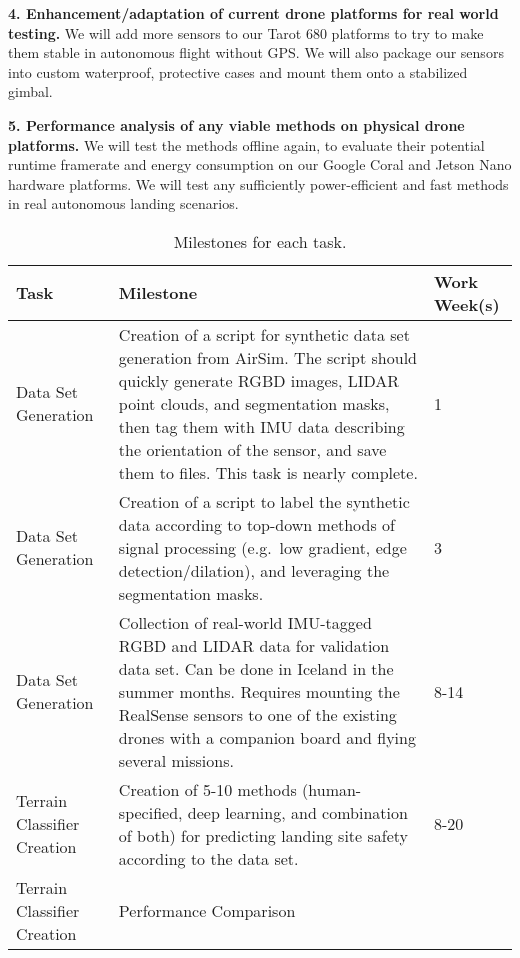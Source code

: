 \textbf{4. Enhancement/adaptation of current drone platforms for real world testing.}
We will add more sensors to our Tarot 680 platforms to try to make them stable in autonomous flight without GPS.
We will also package our sensors into custom waterproof, protective cases and mount them onto a stabilized gimbal.

\textbf{5. Performance analysis of any viable methods on physical drone platforms.}
We will test the methods offline again, to evaluate their potential runtime framerate and energy consumption
on our Google Coral and Jetson Nano hardware platforms.
We will test any sufficiently power-efficient and fast methods in real autonomous landing scenarios.

\begin{table}
    \centering
    \begin{tabular}{|p{2cm}|p{10cm}|p{2cm}|}\hline
        Task & Milestone & Work Week(s)\\\hline
        Data Set Generation & Creation of a script for synthetic data set generation from AirSim. The script should quickly generate RGBD images, LIDAR point clouds, and segmentation masks, then tag them with IMU data describing the orientation of the sensor, and save them to files. This task is nearly complete. & 1\\\hline
        Data Set Generation & Creation of a script to label the synthetic data according to top-down methods of signal processing (e.g.~low gradient, edge detection/dilation), and leveraging the segmentation masks. & 3\\\hline
        Data Set Generation & Collection of real-world IMU-tagged RGBD and LIDAR data for validation data set. Can be done in Iceland in the summer months. Requires mounting the RealSense sensors to one of the existing drones with a companion board and flying several missions. & 8-14\\\hline
        Terrain Classifier Creation & Creation of 5-10 methods (human-specified, deep learning, and combination of both) for predicting landing site safety according to the data set. & 8-20\\\hline
        Terrain Classifier Creation & Performance Comparison & \\\hline
    \end{tabular}
    \caption{Milestones for each task.}
    \label{table:milestones}
\end{table}